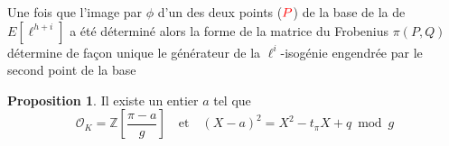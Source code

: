 \documentclass[10pt,a4paper]{beamer}
\theoremstyle{plain}
\theoremstyle{definition}
\theoremstyle{definition}
\theoremstyle{definition}
\newtheorem{prop}[thm]{Proposition}
\theoremstyle{definition}
\theoremstyle{remark}
\theoremstyle{remark}
\theoremstyle{definition}
\begin{document}
\begin{frame}
\begin{center}
\end{center}
Une fois que l'image par $\phi$ d'un des deux points ($\color{red} P$) de la base de la de $E[\ell^{h+i}]$ a été déterminé alors la forme de la matrice du Frobenius $\pi(P,Q)$ détermine de façon unique le générateur de la $\ell^i$-isogénie engendrée par le second point de la base
\end{frame}




\begin{frame}
\begin{prop}
Il existe un entier $a$ tel que \[\mathcal{O}_K=\mathbb{Z} \left[ \frac{\pi-a}{g} \right] \quad \text{et} \quad (X-a)^2=X^2-t_{\pi}X+q \bmod g \]
\end{prop}

\end{frame}
\end{document}
